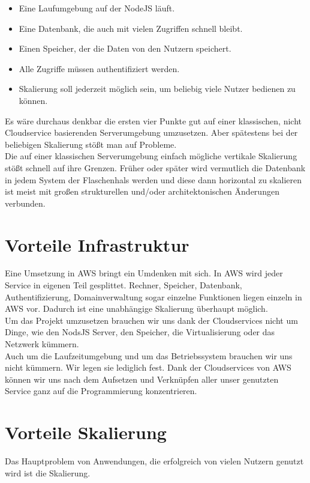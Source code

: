 \documentclass[a4paper, 12pt]{scrreprt}
\renewcommand\_{\textunderscore\allowbreak}
\begin{document}
\begin{itemize}
\item Eine Laufumgebung auf der NodeJS läuft.
\item Eine Datenbank, die auch mit vielen Zugriffen schnell bleibt.
\item Einen Speicher, der die Daten von den Nutzern speichert.
\item Alle Zugriffe müssen authentifiziert werden.
\item Skalierung soll jederzeit möglich sein, um beliebig viele Nutzer bedienen zu können.
\end{itemize}
Es wäre durchaus denkbar die ersten vier Punkte gut auf einer klassischen, nicht Cloudservice basierenden Serverumgebung umzusetzen. Aber spätestens bei der beliebigen Skalierung stößt man auf Probleme. 
\\
Die auf einer klassischen Serverumgebung einfach mögliche vertikale Skalierung stößt schnell auf ihre Grenzen. Früher oder später wird vermutlich die Datenbank in jedem System der Flaschenhals werden und diese dann horizontal zu skalieren ist meist mit großen strukturellen und/oder architektonischen Änderungen verbunden.

\section{Vorteile Infrastruktur}
Eine Umsetzung in AWS bringt ein Umdenken mit sich. In AWS wird jeder Service in eigenen Teil gesplittet. Rechner, Speicher, Datenbank, Authentifizierung, Domainverwaltung sogar einzelne Funktionen liegen einzeln in AWS vor. Dadurch ist eine unabhängige Skalierung überhaupt möglich. \\
Um das Projekt umzusetzen brauchen wir uns dank der Cloudservices nicht um Dinge, wie den NodsJS Server, den Speicher, die Virtualisierung oder das Netzwerk kümmern. \\
Auch um die Laufzeitumgebung und um das Betriebssystem brauchen wir uns nicht kümmern. Wir legen sie lediglich fest. Dank der Cloudservices von AWS können wir uns nach dem Aufsetzen und Verknüpfen aller unser genutzten Service ganz auf die Programmierung konzentrieren.
\section{Vorteile Skalierung}
Das Hauptproblem von Anwendungen, die erfolgreich von vielen Nutzern genutzt wird ist die Skalierung.
\end{document}
